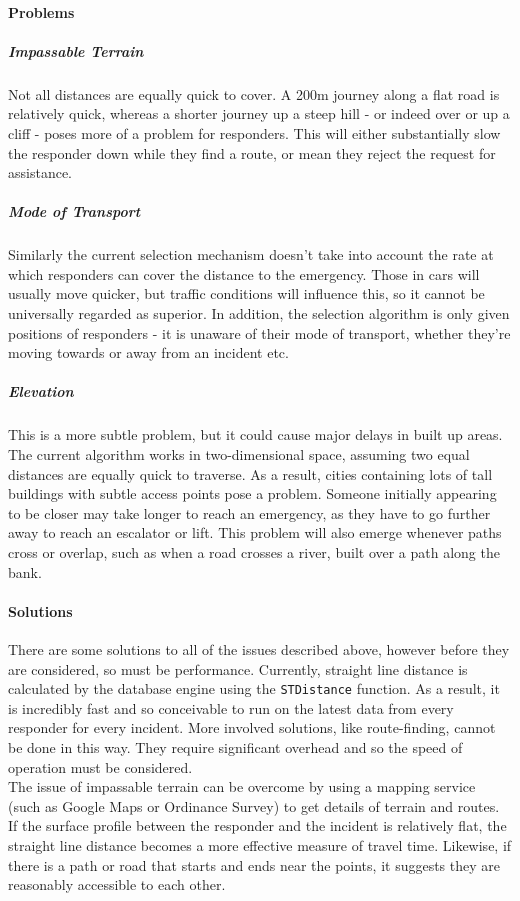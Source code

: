\documentclass{article}
\begin{document}
		\paragraph{Problems}
		\subparagraph{Impassable Terrain}
		Not all distances are equally quick to cover. A 200m journey along a flat road is relatively quick, whereas a shorter journey up a steep hill - or indeed over or up a cliff - poses more of a problem for responders. This will either substantially slow the responder down while they find a route, or mean they reject the request for assistance.
		\subparagraph{Mode of Transport}
		Similarly the current selection mechanism doesn’t take into account the rate at which responders can cover the distance to the emergency. Those in cars will usually move quicker, but traffic conditions will influence this, so it cannot be universally regarded as superior. In addition, the selection algorithm is only given positions of responders - it is unaware of their mode of transport, whether they’re moving towards or away from an incident etc.
		\subparagraph{Elevation}
		This is a more subtle problem, but it could cause major delays in built up areas. The current algorithm works in two-dimensional space, assuming two equal distances are equally quick to traverse. As a result, cities containing lots of tall buildings with subtle access points pose a problem. Someone initially appearing to be closer may take longer to reach an emergency, as they have to go further away to reach an escalator or lift. This problem will also emerge whenever paths cross or overlap, such as when a road crosses a river, built over a path along the bank.

		\paragraph{Solutions}
		There are some solutions to all of the issues described above, however before they are considered, so must be performance. Currently, straight line distance is calculated by the database engine using the \texttt{\color{OliveGreen}STDistance} function. As a result, it is incredibly fast and so conceivable to run on the latest data from every responder for every incident. More involved solutions, like route-finding, cannot be done in this way. They require significant overhead and so the speed of operation must be considered.\\

The issue of impassable terrain can be overcome by using a mapping service (such as Google Maps or Ordinance Survey) to get details of terrain and routes. If the surface profile between the responder and the incident is relatively flat, the straight line distance becomes a more effective measure of travel time. Likewise, if there is a path or road that starts and ends near the points, it suggests they are reasonably accessible to each other.\\
\end{document}

